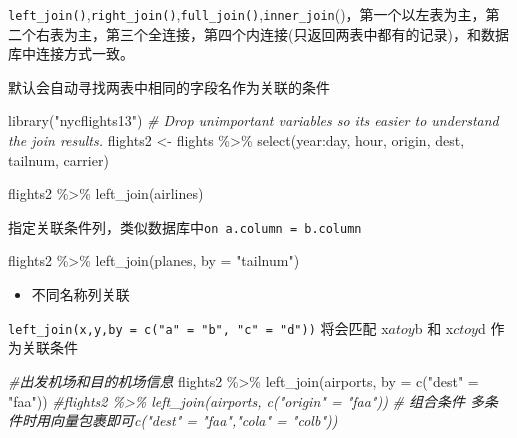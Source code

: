 \documentclass[
]{book}
\newenvironment{Shaded}{\begin{snugshade}}{\end{snugshade}}
\newcommand{\AttributeTok}[1]{\textcolor[rgb]{0.77,0.63,0.00}{#1}}
\newcommand{\CommentTok}[1]{\textcolor[rgb]{0.56,0.35,0.01}{\textit{#1}}}
\newcommand{\FunctionTok}[1]{\textcolor[rgb]{0.00,0.00,0.00}{#1}}
\newcommand{\NormalTok}[1]{#1}
\newcommand{\OtherTok}[1]{\textcolor[rgb]{0.56,0.35,0.01}{#1}}
\newcommand{\SpecialCharTok}[1]{\textcolor[rgb]{0.00,0.00,0.00}{#1}}
\newcommand{\StringTok}[1]{\textcolor[rgb]{0.31,0.60,0.02}{#1}}
\providecommand{\tightlist}{%
  \setlength{\itemsep}{0pt}\setlength{\parskip}{0pt}}
\begin{document}
\texttt{left\_join()},\texttt{right\_join()},\texttt{full\_join()},\texttt{inner\_join}()，第一个以左表为主，第二个右表为主，第三个全连接，第四个内连接(只返回两表中都有的记录)，和数据库中连接方式一致。

默认会自动寻找两表中相同的字段名作为关联的条件

\begin{Shaded}
\begin{Highlighting}[]
\FunctionTok{library}\NormalTok{(}\StringTok{"nycflights13"}\NormalTok{)}
\CommentTok{\# Drop unimportant variables so it\textquotesingle{}s easier to understand the join results.}
\NormalTok{flights2 }\OtherTok{\textless{}{-}}\NormalTok{ flights }\SpecialCharTok{\%\textgreater{}\%} \FunctionTok{select}\NormalTok{(year}\SpecialCharTok{:}\NormalTok{day, hour, origin, dest, tailnum, carrier)}

\NormalTok{flights2 }\SpecialCharTok{\%\textgreater{}\%} 
  \FunctionTok{left\_join}\NormalTok{(airlines)}
\end{Highlighting}
\end{Shaded}

指定关联条件列，类似数据库中\texttt{on\ a.column\ =\ b.column}

\begin{Shaded}
\begin{Highlighting}[]
\NormalTok{flights2 }\SpecialCharTok{\%\textgreater{}\%} \FunctionTok{left\_join}\NormalTok{(planes, }\AttributeTok{by =} \StringTok{"tailnum"}\NormalTok{)}
\end{Highlighting}
\end{Shaded}

\begin{itemize}
\tightlist
\item
  不同名称列关联
\end{itemize}

\texttt{left\_join(x,y,by\ =\ c("a"\ =\ "b",\ "c"\ =\ "d"))} 将会匹配 x\(a to y\)b 和 x\(c to y\)d 作为关联条件

\begin{Shaded}
\begin{Highlighting}[]
\CommentTok{\#出发机场和目的机场信息}
\NormalTok{flights2 }\SpecialCharTok{\%\textgreater{}\%} \FunctionTok{left\_join}\NormalTok{(airports, }\AttributeTok{by =} \FunctionTok{c}\NormalTok{(}\StringTok{"dest"} \OtherTok{=} \StringTok{"faa"}\NormalTok{))}
\CommentTok{\#flights2 \%\textgreater{}\% left\_join(airports, c("origin" = "faa"))}
\CommentTok{\# 组合条件 多条件时用向量包裹即可c("dest" = "faa","cola" = "colb"))}
\end{Highlighting}
\end{Shaded}
\end{document}
